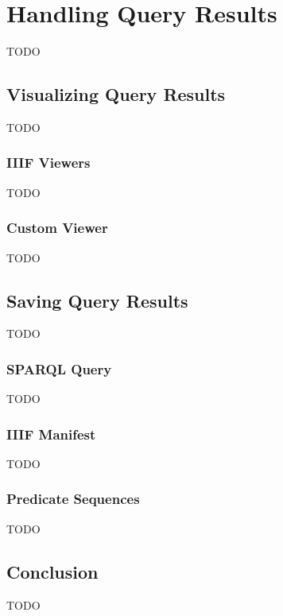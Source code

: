 \chapter{Handling Query Results}
\label{chap:handling_query_results}

TODO

\section{Visualizing Query Results}
\label{sec:visualizing_query_results}

TODO

\subsection{IIIF Viewers}

TODO

\subsection{Custom Viewer}

TODO

\section{Saving Query Results}
\label{sec:saving_query_results}

TODO

\subsection{SPARQL Query}

TODO

\subsection{IIIF Manifest}

TODO

\subsection{Predicate Sequences}

TODO

\section{Conclusion}

TODO